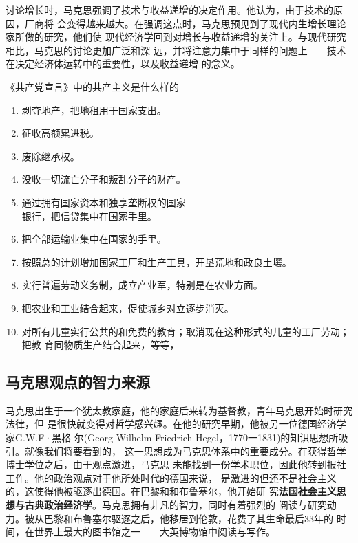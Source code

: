 讨论增长时，马克思强调了技术与收益递增的决定作用。他认为，由于技术的原因，厂商将
会变得越来越大。在强调这点时，马克思预见到了现代内生增长理论家所做的研究，他们使
现代经济学回到对增长与收益递增的关注上。与现代研究相比，马克思的讨论更加广泛和深
远，并将注意力集中于同样的问题上——技术在决定经济体运转中的重要性，以及收益递增
的念义。\clearpage
\begin{mybox}{《共产党宣言》中的共产主义是什么样的}
  \begin{multicols}{2}
    \begin{enumerate}
    \item 剥夺地产，把地租用于国家支出。
    \item 征收高额累进税。
    \item 废除继承权。
    \item 没收一切流亡分子和叛乱分子的财产。
    \item 通过拥有国家资本和独享垄断权的国家\\银行，把信贷集中在国家手里。
    \item 把全部运输业集中在国家的手里。
    \item 按照总的计划增加国家工厂和生产工具，开垦荒地和政良土壤。
    \item 实行普遍劳动义务制，成立产业军，特别是在农业方面。
    \item 把农业和工业结合起来，促使城乡对立逐步消灭。
    \item 对所有儿童实行公共的和免费的教育；取消现在这种形式的儿童的工厂劳动；把教
      育同物质生产结合起来，等等，
    \end{enumerate}
  \end{multicols}
\end{mybox}

\subsection{马克思观点的智力来源}
马克思出生于一个犹太教家庭，他的家庭后来转为基督教，青年马克思开始时研究法律，但
是很快就变得对哲学感兴趣。在他的研究早期，他被另一位德国经济学家G.W.F·黑格
尔(Georg Wilhelm Friedrich Hegel，1770一1831)的知识思想所吸引。就像我们将要看到的，
这一思想成为马克思体系中的重要成分。在获得哲学博士学位之后，由于观点激进，马克思
未能找到一份学术职位，因此他转到报社工作。他的政治观点对于他所处时代的德国来说，
是激进的但还不是社会主义的，这使得他被驱逐出德国。在巴黎和和布鲁塞尔，他开始研
究\textbf{法国社会主义思想与古典政治经济学}。马克思拥有非凡的智力，同时有着强烈的
阅读与研究动力。被从巴黎和布鲁塞尔驱逐之后，他移居到伦敦，花费了其生命最后33年的
时间，在世界上最大的图书馆之一——大英博物馆中阅读与写作。

